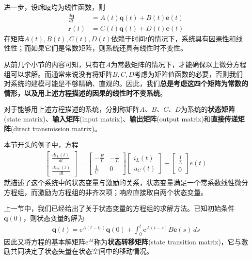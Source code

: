 进一步，设$\mathbf{f}$和$\mathbf{g}$均为线性函数，则\begin{align*}
    \frac{d\mathbf{q}}{dt}&=A(t)\mathbf{q}(t)+B(t)\mathbf{e}(t)\\
    \mathbf{r}(t)&=C(t)\mathbf{q}(t)+D(t)\mathbf{e}(t)
\end{align*}
在矩阵$A(t),B(t),C(t),D(t)$依赖于时间$t$的情况下，系统具有因果性和线性性；而如果它们是常数矩阵，则系统还具有线性时不变性。

从前几个小节的内容可知，只有在$A$为常数矩阵的情况下，才能确保以上微分方程组可以求解。而通常来说没有将矩阵$B,C,D$考虑为矩阵值函数的必要，否则我们对系统的建模可能是不够精确、直观的。因此，我们\textbf{总是考虑这四个矩阵为常数的情形，以及用上述方程描述的因果的线性时不变系统}。

\begin{definition}
    对于能够用上述方程描述的系统，分别称矩阵$A$、$B$、$C$、$D$为系统的\textbf{状态矩阵}(state matrix)、\textbf{输入矩阵}(input matrix)、\textbf{输出矩阵}(output matrix)和\textbf{直接传递矩阵}(direct transmission matrix)。
\end{definition}

\begin{example}
    本节开头的例子中，方程\begin{align*}
            \begin{bmatrix}
                \frac{di_L(t)}{dt}\\
                \frac{du_C(t)}{dt}
            \end{bmatrix}=
            \begin{bmatrix}
                -\frac{R}{L} & -\frac{1}{L}\\
                \frac{1}{C} & 0
            \end{bmatrix}
            \begin{bmatrix}
                i_L(t)\\
                u_C(t)
            \end{bmatrix}+
            \begin{bmatrix}
                \frac{1}{L}\\
                0
            \end{bmatrix}e(t)
        \end{align*}
    就描述了这个系统中的状态变量与激励的关系，状态变量满足一个常系数线性微分方程组，而激励为方程组的非齐次项；响应直接取自两个状态变量。
\end{example}

上一节中，我们已经给出了关于状态变量的方程组的求解方法。已知初始条件$\mathbf{q}(0)$，则状态变量的解为\begin{align*}
    \mathbf{q}(t)=\mathrm{e}^{A(t-t_0)}\mathbf{q}(0)+\int_{0}^t \mathrm{e}^{A(t-s)}B\mathbf{e}(s)\,ds
\end{align*}
因此又将方程的基本解矩阵$\mathrm{e}^{At}$称为\textbf{状态转移矩阵}(state transition matrix)，它与激励共同决定了状态矢量在状态空间中的移动情况。

